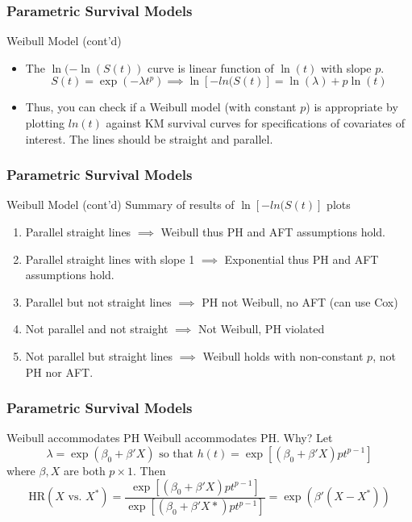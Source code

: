 \documentclass{beamer}
\theoremstyle{definition}
\begin{document}
\begin{frame}
\frametitle{Parametric Survival Models}
\begin{block}{Weibull Model (cont'd)}
\begin{itemize}
\item The $\ln(-\ln(S(t))$ curve is linear function of $\ln(t)$ with slope $p$.
\[ S(t)  = \exp(-\lambda t^p) \implies \ln[-ln(S(t)] = \ln(\lambda) + p \ln(t)
\]
\item Thus, you can check if a Weibull model (with constant $p$) is appropriate by plotting $ln(t)$ against KM survival curves for specifications of covariates of interest. The lines should be straight and parallel.

\end{itemize}
\end{block}
\end{frame}


\begin{frame}
\frametitle{Parametric Survival Models}
\begin{block}{Weibull Model (cont'd)}
Summary of results of $\ln[-ln(S(t)]$ plots
\begin{enumerate}
\item Parallel straight lines $\implies$ Weibull thus PH and AFT assumptions hold.
\item Parallel straight lines with slope 1 $\implies$ Exponential thus PH and AFT assumptions hold.
\item Parallel but not straight lines $\implies$ PH not Weibull, no AFT (can use Cox)
\item Not parallel and not straight $\implies$ Not Weibull, PH violated
\item Not parallel but straight lines $\implies$ Weibull holds with non-constant $p$, not PH nor AFT.
\end{enumerate}
\end{block}
\end{frame}

\begin{frame}
\frametitle{Parametric Survival Models}
\begin{block}{Weibull accommodates PH}
Weibull accommodates PH. Why? Let
\[
\lambda=\exp(\beta_0 + \beta' X) \text{ so that }  h(t) = \exp[(\beta_0 + \beta' X) p t^{p-1}]
\] where $\beta, X$ are both $p \times 1$.
Then
\[
\text{HR}(X \text{ vs. } X^*)  = \dfrac{ \exp[(\beta_0 + \beta' X) p t^{p-1}]}{ \exp[(\beta_0 + \beta' X*) p t^{p-1}]} = \exp(\beta'(X - X^*))
\]
\end{block}
\end{frame}
\end{document}
